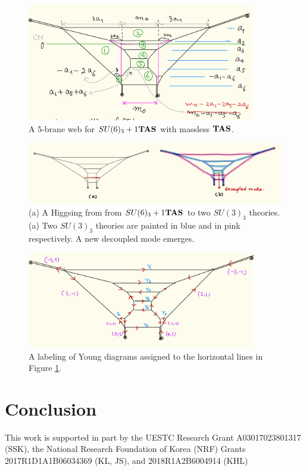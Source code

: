 \documentclass[letterpaper, 11pt]{article}
\begin{document}
\begin{figure}[t]
\centering
\includegraphics[width=10cm]{SU6-monopole.jpeg}
\caption{A 5-brane web for $SU(6)_3+1{\bf TAS}$ with massless ${\bf TAS}$.}
\label{fig:SU6-monopole}
\end{figure}

\begin{figure}[t]
\centering
\includegraphics[width=12cm]{SU6-Higgsing.jpeg}
\caption{(a) A Higgsing from from $SU(6)_3+1{\bf TAS}$ to two $SU(3)_3$ theories. (a) Two $SU(3)_3$ theories are painted in blue and in pink respectively. A new decoupled mode emerges.}
\label{fig:SU6-Higgsing}
\end{figure}

\begin{figure}[t]
\centering
\includegraphics[width=10cm]{SU6young.jpeg}
\caption{A labeling of Young diagrams assigned to the horizontal lines in Figure \ref{fig:SU6-monopole}.}
\label{fig:SU6young}
\end{figure}



\section{Conclusion} \label{sec:conclusion}


\acknowledgments
This work is supported in part by the UESTC Research Grant A03017023801317 (SSK), the National Research Foundation of Korea (NRF) Grants 2017R1D1A1B06034369 (KL, JS), and 2018R1A2B6004914 (KHL)




\end{document}
